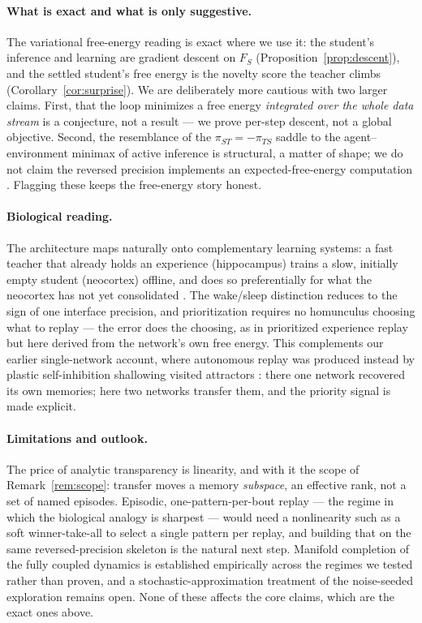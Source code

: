 \documentclass[10pt,letterpaper]{article}
\theoremstyle{plain}
\theoremstyle{remark}
\newcommand{\FS}{F_S}
\newcommand{\piTS}{\pi_{TS}}
\newcommand{\piST}{\pi_{ST}}
\begin{document}
\paragraph{What is exact and what is only suggestive.} The variational free-energy reading is exact where
we use it: the student's inference and learning are gradient descent on $\FS$
(Proposition~\ref{prop:descent}), and the settled student's free energy is the novelty score the teacher
climbs (Corollary~\ref{cor:surprise}). We are deliberately more cautious with two larger claims. First,
that the loop minimizes a free energy \emph{integrated over the whole data stream} is a conjecture, not a
result --- we prove per-step descent, not a global objective. Second, the resemblance of the
$\piST=-\piTS$ saddle to the agent--environment minimax of active inference is structural, a matter of
shape; we do not claim the reversed precision implements an expected-free-energy computation
\cite{millidge2021whence}. Flagging these keeps the free-energy story honest.

\paragraph{Biological reading.} The architecture maps naturally onto complementary learning systems: a
fast teacher that already holds an experience (hippocampus) trains a slow, initially empty student
(neocortex) offline, and does so preferentially for what the neocortex has not yet consolidated
\cite{mcclelland1995cls,kumaran2016what,wilson1994reactivation,diekelmann2010memory}. The wake/sleep
distinction reduces to the sign of one interface precision, and prioritization requires no homunculus
choosing what to replay --- the error does the choosing, as in prioritized experience replay
\cite{schaul2016prioritized} but here derived from the network's own free energy. This complements our
earlier single-network account, where autonomous replay was produced instead by plastic self-inhibition
shallowing visited attractors \cite{saighi2025autonomous}: there one network recovered its own memories;
here two networks transfer them, and the priority signal is made explicit.

\paragraph{Limitations and outlook.} The price of analytic transparency is linearity, and with it the
scope of Remark~\ref{rem:scope}: transfer moves a memory \emph{subspace}, an effective rank, not a set of
named episodes. Episodic, one-pattern-per-bout replay --- the regime in which the biological analogy is
sharpest --- would need a nonlinearity such as a soft winner-take-all to select a single pattern per
replay, and building that on the same reversed-precision skeleton is the natural next step. Manifold
completion of the fully coupled dynamics is established empirically across the regimes we tested rather
than proven, and a stochastic-approximation treatment of the noise-seeded exploration remains open. None
of these affects the core claims, which are the exact ones above.
\end{document}
